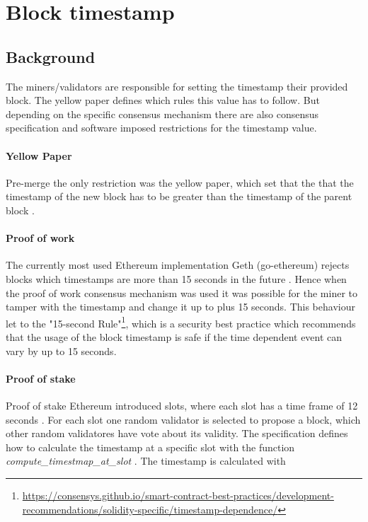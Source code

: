 \section{Block timestamp}

\subsection{Background} 
The miners/validators are responsible for setting the timestamp their provided block.
The yellow paper defines which rules this value has to follow. But depending on
the specific consensus mechanism there are also consensus specification and
software imposed restrictions for the timestamp value. 

\paragraph{Yellow Paper}
Pre-merge the only restriction was the yellow paper, which set that the that
the timestamp of the new block has to be greater than the timestamp of the
parent block \cite{ethyellowpaper2023}.

\paragraph{Proof of work}
The currently most used Ethereum implementation Geth (go-ethereum) rejects
blocks which timestamps are more than 15 seconds in the future
\cite{go-ethereum-15-sek-limit}. Hence when the proof of work consensus
mechanism was used it was possible for the miner to tamper with the timestamp
and change it up to plus 15 seconds. This behaviour let to the "15-second
Rule"\footnote{\url{https://consensys.github.io/smart-contract-best-practices/development-recommendations/solidity-specific/timestamp-dependence/}},
which is a security best practice which recommends that the usage of the block
timestamp is safe if the time dependent event can vary by up to 15 seconds.

\paragraph{Proof of stake}
Proof of stake Ethereum introduced slots, where each slot has a time frame of
12 seconds \cite{seconds-per-slot-mainnet}\cite{seconds-per-slot-mainnet-doc}.
For each slot one random validator is selected to propose a block, which other
random validatores have vote about its validity. The specification defines
how to calculate the timestamp at a specific slot with the function
\textit{compute\_timestmap\_at\_slot} \cite{compute-timestamp-at-slot}. The
timestamp is calculated with 

